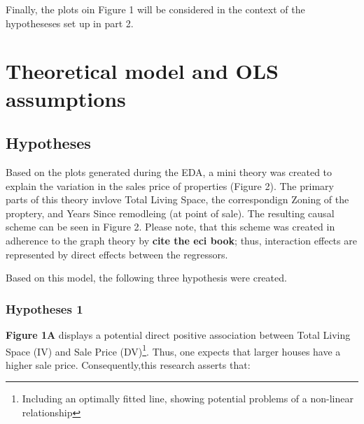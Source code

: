 \documentclass[a4paper]{article}
\begin{document}
Finally, the plots oin Figure 1 will be considered in the context of the hypotheseses set up in part 2. 



\section{Theoretical model and OLS assumptions}
\subsection{Hypotheses}
Based on the plots generated during the EDA, a mini theory was created to explain the variation in the sales price of properties (Figure 2). The primary parts of this theory invlove Total Living Space, the correspondign Zoning of the proptery, and Years Since remodleing (at point of sale). The resulting causal scheme can be seen in Figure 2. Please note, that this scheme was created in adherence to the graph theory by \textbf{cite the eci book}; thus, interaction effects are represented by direct effects between the regressors.




Based on this model, the following three hypothesis were created. 
\subsubsection{Hypotheses 1}

\begin{center}
\end{center}

\indent \textbf{Figure 1A} displays a potential direct positive association between Total Living Space (IV) and Sale Price (DV)\footnote{Including an optimally fitted line, showing potential problems of a non-linear relationship}. Thus, one expects that larger houses have a higher sale price. Consequently,this research asserts that:
\end{document}

